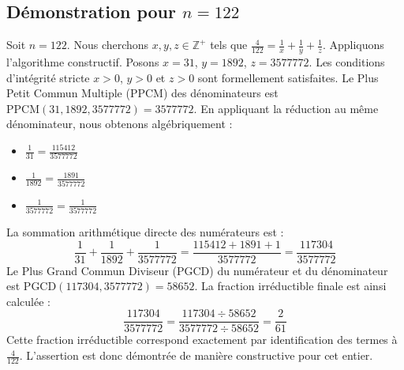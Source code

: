 \documentclass[11pt,a4paper]{article}
\begin{document}
\subsection{Démonstration pour $n = 122$}
Soit $n = 122$. Nous cherchons $x, y, z \in \mathbb{Z}^{+}$ tels que $\frac{4}{122} = \frac{1}{x} + \frac{1}{y} + \frac{1}{z}$.
Appliquons l'algorithme constructif. Posons $x = 31$, $y = 1892$, $z = 3577772$.
Les conditions d'intégrité stricte $x > 0$, $y > 0$ et $z > 0$ sont formellement satisfaites.
Le Plus Petit Commun Multiple (PPCM) des dénominateurs est $\text{PPCM}(31, 1892, 3577772) = 3577772$.
En appliquant la réduction au même dénominateur, nous obtenons algébriquement :
\begin{itemize}
    \item $\frac{1}{31} = \frac{115412}{3577772}$
    \item $\frac{1}{1892} = \frac{1891}{3577772}$
    \item $\frac{1}{3577772} = \frac{1}{3577772}$
\end{itemize}
La sommation arithmétique directe des numérateurs est :
$$ \frac{1}{31} + \frac{1}{1892} + \frac{1}{3577772} = \frac{115412 + 1891 + 1}{3577772} = \frac{117304}{3577772} $$
Le Plus Grand Commun Diviseur (PGCD) du numérateur et du dénominateur est $\text{PGCD}(117304, 3577772) = 58652$.
La fraction irréductible finale est ainsi calculée :
$$ \frac{117304}{3577772} = \frac{117304 \div 58652}{3577772 \div 58652} = \frac{2}{61} $$
Cette fraction irréductible correspond exactement par identification des termes à $\frac{4}{122}$. L'assertion est donc démontrée de manière constructive pour cet entier.
\end{document}
